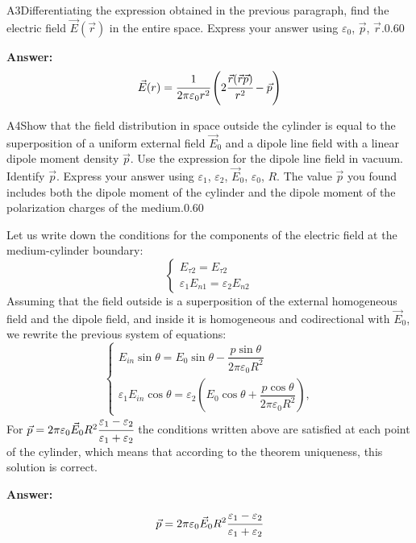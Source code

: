 \documentclass[11pt,a4paper]{article}
\begin{document}
\begin{solcard}{A3}{Differentiating the expression obtained in the previous paragraph, find the electric field $\vec{E}(\vec{r})$ in the entire space. Express your answer using $\varepsilon_0$, $\vec p$, $\vec{r}$.}{0.60}
\par\smallskip\noindent\textbf{Answer:} \[\vec E(r)=\cfrac{1}{2\pi\varepsilon_0r^2}\left( 2\cfrac{\vec{r}(\vec{r}\vec{p})}{r^2} - \vec{p}\right)\]
\end{solcard}

\begin{solcard}{A4}{Show that the field distribution in space outside the cylinder is equal to the superposition of a uniform external field $\vec E_0$ and a dipole line field with a linear dipole moment density $\vec p$. Use the expression for the dipole line field in vacuum. Identify $\vec p$. Express your answer using $\varepsilon_1$, $\varepsilon_2$, $\vec{E}_0$, $\varepsilon_0$, $R$. The value $\vec{p}$ you found includes both the dipole moment of the cylinder and the dipole moment of the polarization charges of the medium.}{0.60}

Let us write down the conditions for the components of the electric field at the medium-cylinder boundary: \[\begin{cases}E_{\tau2}=E_{\tau2}\\ \varepsilon_1E_{n1}=\varepsilon_2E_{n2}\end{cases}\] Assuming that the field outside is a superposition of the external homogeneous field and the dipole field, and inside it is homogeneous and codirectional with $\vec E_0$, we rewrite the previous system of equations: \[\begin{cases}E_{in}\sin\theta=E_0\sin\theta-\dfrac{p\sin\theta}{2\pi \varepsilon_0R^2}\\\varepsilon _1E_{in}\cos\theta=\varepsilon _2\left(E_0\cos\theta+\dfrac{p\cos\theta}{2\pi \varepsilon_0R^2}\right),\end{cases}\]For $\vec p=2\pi\varepsilon_0\vec E_0R^2\cfrac{\varepsilon_1-\varepsilon_2}{\varepsilon_1+\varepsilon_2}$ the conditions written above are satisfied at each point of the cylinder, which means that according to the theorem uniqueness, this solution is correct.

\par\smallskip\noindent\textbf{Answer:} \[\vec p=2\pi\varepsilon_0\vec E_0R^2\cfrac{\varepsilon_1-\varepsilon_2}{\varepsilon_1+\varepsilon_2}\]
\end{solcard}
\end{document}
